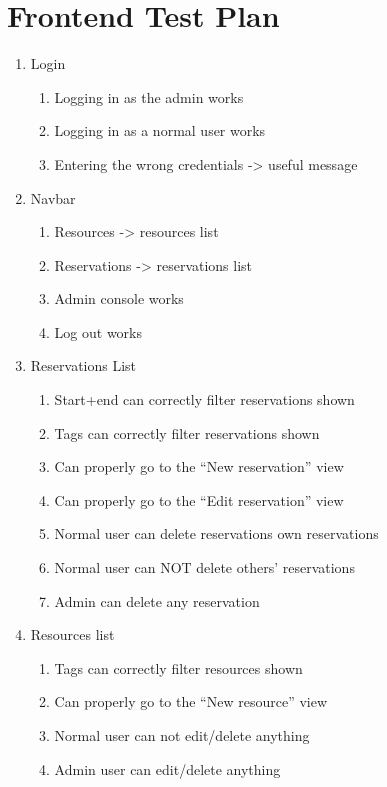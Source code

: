 \documentclass[12pt]{article}
\begin{document}
\clearpage
\section{Frontend Test Plan}
\label{appendix:frontendtest}
\begin{enumerate}
    \item Login
    \begin{enumerate}
        \item Logging in as the admin works
        \item Logging in as a normal user works
        \item Entering the wrong credentials -> useful message
    \end{enumerate}
    \item Navbar
    \begin{enumerate}
        \item Resources -> resources list
        \item Reservations -> reservations list
        \item Admin console works
        \item Log out works
    \end{enumerate}
    \item Reservations List
    \begin{enumerate}
        \item Start+end can correctly filter reservations shown
        \item Tags can correctly filter reservations shown
        \item Can properly go to the ``New reservation'' view
        \item Can properly go to the ``Edit reservation'' view
        \item Normal user can delete reservations own reservations
        \item Normal user can NOT delete others' reservations
        \item Admin can delete any reservation
    \end{enumerate}
    \item Resources list
    \begin{enumerate}
        \item Tags can correctly filter resources shown
        \item Can properly go to the ``New resource'' view
        \item Normal user can not edit/delete anything
        \item Admin user can edit/delete anything

\end{enumerate}
\end{enumerate}
\end{document}
